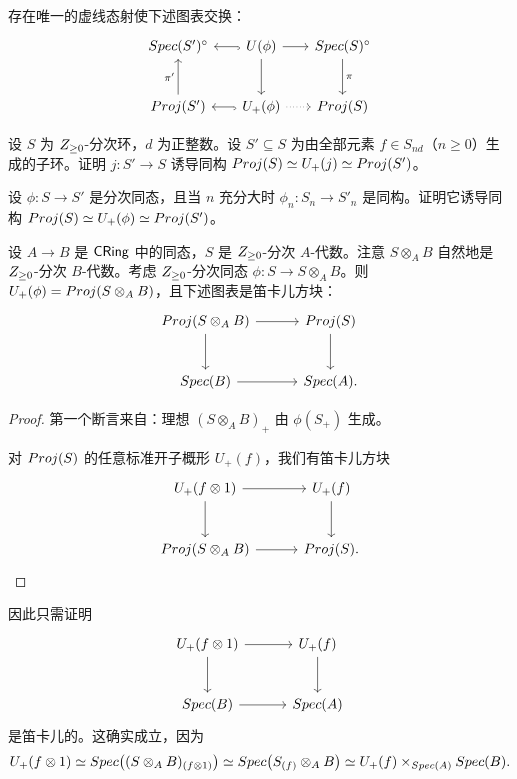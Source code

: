 \begin{proposition}\label{prop:25.3.2}
存在唯一的虚线态射使下述图表交换：
\[
\begin{tikzcd}[column sep=1.6em, row sep=2.6em]
\Spec(S')^{\circ} & U(\phi) \arrow[l, hook] \arrow[r] \arrow[d] & \Spec(S)^{\circ} \arrow[d, "\pi"] \\
\Proj(S') \arrow[u, "\pi'"] & U_+(\phi) \arrow[l, hook] \arrow[r, dotted] & \Proj(S)
\end{tikzcd}
\]
\end{proposition}

\begin{exercise}\label{exc:25.3.3}
设 $S$ 为 $Z_{\ge 0}$-分次环，$d$ 为正整数。设 $S' \subseteq S$ 为由全部元素 $f \in S_{nd}$（$n \ge 0$）生成的子环。证明 $j \colon S' \to S$ 诱导同构 $Proj(S) \simeq U_+(j) \simeq Proj(S')$。
\end{exercise}

\begin{exercise}\label{exc:25.3.4}
设 $\phi \colon S \to S'$ 是分次同态，且当 $n$ 充分大时 $\phi_n \colon S_n \to S'_n$ 是同构。证明它诱导同构 $Proj(S) \simeq U_+(\phi) \simeq Proj(S')$。
\end{exercise}

\begin{lemma}\label{lem:25.3.5}
设 $A \to B$ 是 $\mathsf{CRing}$ 中的同态，$S$ 是 $Z_{\ge 0}$-分次 $A$-代数。注意 $S \otimes_A B$ 自然地是 $Z_{\ge 0}$-分次 $B$-代数。考虑 $Z_{\ge 0}$-分次同态 $\phi \colon S \to S \otimes_A B$。则 $U_+(\phi) = Proj(S \otimes_A B)$，且下述图表是笛卡儿方块：
\[
\begin{tikzcd}[column sep=3em, row sep=2.6em]
\Proj(S \otimes_A B) \arrow[r] \arrow[d] & \Proj(S) \arrow[d] \\
\Spec(B) \arrow[r] & \Spec(A).
\end{tikzcd}
\]
\end{lemma}

\begin{proof}
第一个断言来自：理想 $(S \otimes_A B)_+$ 由 $\phi(S_+)$ 生成。

对 $Proj(S)$ 的任意标准开子概形 $U_+(f)$，我们有笛卡儿方块
\[
\begin{tikzcd}[column sep=3em, row sep=2.6em]
U_+(f \otimes 1) \arrow[r] \arrow[d] & U_+(f) \arrow[d] \\
\Proj(S \otimes_A B) \arrow[r] & \Proj(S).
\end{tikzcd}
\]
\end{proof}

因此只需证明
\[
\begin{tikzcd}[column sep=3em, row sep=2.6em]
U_+(f \otimes 1) \arrow[r] \arrow[d] & U_+(f) \arrow[d] \\
\Spec(B) \arrow[r] & \Spec(A)
\end{tikzcd}
\]
是笛卡儿的。这确实成立，因为
\[
U_+(f \otimes 1) \simeq Spec\bigl((S \otimes_A B)_{(f \otimes 1)}\bigr) \simeq Spec\bigl(S_{(f)} \otimes_A B\bigr) \simeq U_+(f) \times_{Spec(A)} Spec(B).
\]
\eop


